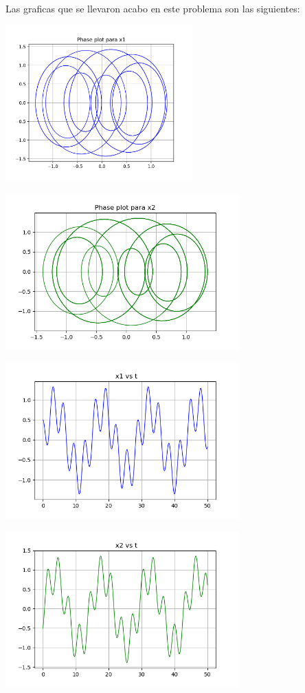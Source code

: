 \documentclass{article}
\begin{document}
Las graficas que se llevaron acabo en este problema son las siguientes:

\begin{center}
\includegraphics[height=6cm]{resortes2_3_1.png}
\end{center}

\begin{center}
\includegraphics[height=6cm]{resortes2_3_2.png}
\end{center}


\begin{center}
\includegraphics[height=6cm]{resortes2_3_3.png}
\end{center}

\begin{center}
\includegraphics[height=6cm]{resortes2_3_4.png}
\end{center}
\end{document}
